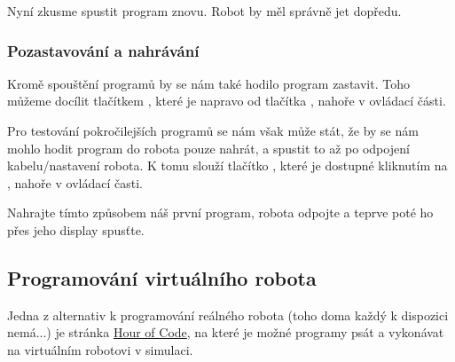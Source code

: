 \documentclass[main.tex]{subfiles}
\begin{document}
	Nyní zkusme spustit program znovu. Robot by měl správně jet dopředu.

	\subsubsection{Pozastavování a nahrávání}
	Kromě spouštění programů by se nám také hodilo program zastavit. Toho můžeme docílit tlačítkem , které je napravo od tlačítka , nahoře v ovládací části.

	Pro testování pokročilejších programů se nám však může stát, že by se nám mohlo hodit program do robota pouze nahrát, a spustit to až po odpojení kabelu/nastavení robota. K tomu slouží tlačítko , které je dostupné kliknutím na , nahoře v ovládací časti.

	\begin{question}
		Nahrajte tímto způsobem náš první program, robota odpojte a teprve poté ho přes jeho display spusťte.
	\end{question}

	\subsection{Programování virtuálního robota}
	Jedna z alternativ k programování reálného robota (toho doma každý k dispozici nemá...) je stránka \href{http://www.robotmesh.com/create/176384}{Hour of Code}, na které je možné programy psát a vykonávat na virtuálním robotovi v simulaci.
\end{document}
